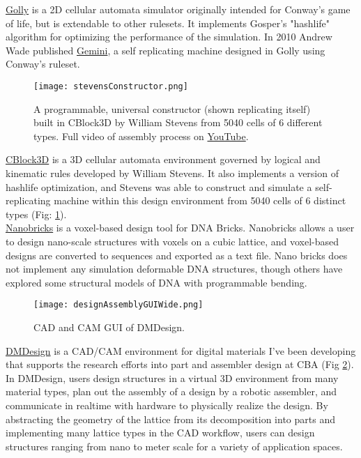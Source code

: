 {\href{http://golly.sourceforge.net/}{Golly} is a 2D cellular automata simulator originally intended for Conway's game of life, but is extendable to other rulesets.  It implements Gosper's "hashlife" algorithm for optimizing the performance of the simulation\cite{Gosper1984}.  In 2010 Andrew Wade published \href{https://www.youtube.com/watch?v=A8B5MbHPlH0}{Gemini}, a self replicating machine designed in Golly using Conway's ruleset.
\\

\begin{figure}
  \texttt{[image: stevensConstructor.png]}
  \caption{A programmable, universal constructor (shown replicating itself) built in CBlock3D by William Stevens from 5040 cells of 6 different types\cite{Stevens2009b}.  Full video of assembly process on  \href{https://www.youtube.com/watch?v=PBXO_6Jn1fs}{YouTube}.}
  \label{fig:stevensConstructor}
\end{figure}
\href{https://www.youtube.com/watch?feature=player_embedded&v=PBXO_6Jn1fs}{CBlock3D} is a 3D cellular automata environment governed by logical and kinematic rules developed by William Stevens\cite{Stevens2007}\cite{Stevens2009}.  It also implements a version of hashlife optimization\cite{Stevens2010}, and Stevens was able to construct and simulate a self-replicating machine within this design environment from 5040 cells of 6 distinct types (Fig: \ref{fig:stevensConstructor})\cite{Stevens2009b}.
\\

\href{http://yin.hms.harvard.edu/bricks/try/}{Nanobricks} is a voxel-based design tool for DNA Bricks.  Nanobricks allows a user to design nano-scale structures with voxels on a cubic lattice, and voxel-based designs are converted to sequences and exported as a text file.  Nano bricks does not implement any simulation deformable DNA structures, though others have explored some structural models of DNA with programmable bending\cite{Dietz2009}\cite{Kim2012}.
\\

\begin{figure}
  \texttt{[image: designAssemblyGUIWide.png]}
  \caption{CAD and CAM GUI of DMDesign.}
  \label{fig: designAssemblyGUIWide}
\end{figure}
\href{http://dma.cba.mit.edu/dmdesign/}{DMDesign} is a CAD/CAM environment for digital materials I've been developing that supports the research efforts into part and assembler design at CBA (Fig \ref{fig: designAssemblyGUIWide}).  In DMDesign, users design structures in a virtual 3D environment from many material types, plan out the assembly of a design by a robotic assembler, and communicate in realtime with hardware to physically realize the design.  By abstracting the geometry of the lattice from its decomposition into parts and implementing many lattice types in the CAD workflow, users can design structures ranging from nano to meter scale for a variety of application spaces.

}
